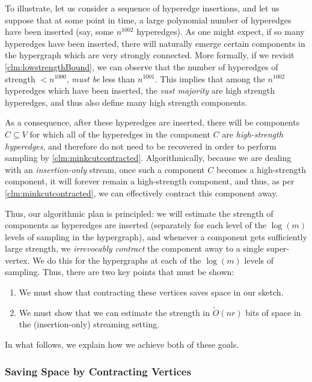 \documentclass[11pt]{article}
\theoremstyle{definition}
\begin{document}
To illustrate, let us consider a sequence of hyperedge insertions, and let us suppose that at some point in time, a large polynomial number of hyperedges have been inserted (say, some $n^{1002}$ hyperedges). As one might expect, if so many hyperedges have been inserted, there will naturally emerge certain components in the hypergraph which are very strongly connected. More formally, if we revisit \cref{clm:lowstrengthBound}, we can observe that the number of hyperedges of strength $< n^{1000}$, \emph{must be} less than $n^{1001}$. This implies that among the $n^{1002}$ hyperedges which have been inserted, the \emph{vast majority} are high strength hyperedges, and thus also define many high strength components. 

As a consequence, after these hyperedges are inserted, there will be components $C \subseteq V$ for which all of the hyperedges in the component $C$ are \emph{high-strength hyperedges}, and therefore do not need to be recovered in order to perform sampling by \cref{clm:minkcutcontracted}. Algorithmically, because we are dealing with an \emph{insertion-only} stream, once such a component $C$ becomes a high-strength component, it will forever remain a high-strength component, and thus, as per \cref{clm:minkcutcontracted}, we can effectively contract this component away. 

Thus, our algorithmic plan is principled: we will estimate the strength of components as hyperedges are inserted (separately for each level of the $\log(m)$ levels of sampling in the hypergraph), and whenever a component gets sufficiently large strength, we \emph{irrevocably contract} the component away to a single super-vertex. We do this for the hypergraphs at each of the $\log(m)$ levels of sampling. Thus, there are two key points that must be shown:
\begin{enumerate}
    \item We must show that contracting these vertices saves space in our sketch.
    \item We must show that we can estimate the strength in $\widetilde{O}(nr)$ bits of space in the (insertion-only) streaming setting. 
\end{enumerate}

In what follows, we explain how we achieve both of these goals.

\subsubsection{Saving Space by Contracting Vertices}
\end{document}
